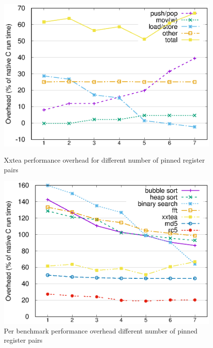 \begin{figure}
 \centering
 \begin{minipage}{0.45\textwidth}
  \centering
  \includegraphics[width=\myfiguresizexxtea]{pinnedregs-performance-xxtea.eps}
  \caption{Xxtea performance overhead for different number of pinned register pairs}
  \label{fig-performance-pinnedregs-xxtea-per-opcode-category}
 \end{minipage}\hfill
 \begin{minipage}{0.45\textwidth}
  \centering
  \includegraphics[width=\myfiguresizexxtea]{pinnedregs-performance-all-benchmarks.eps}
  \caption{Per benchmark performance overhead different number of pinned register pairs}
  \label{fig-performance-pinnedregs-per-benchmark}
 \end{minipage}
\end{figure}

